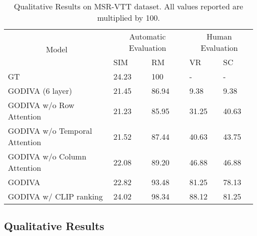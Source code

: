 \documentclass{article}
\begin{document}
\newcommand{\pwidth}{1.3cm}
\begin{table*}[h]
\begin{center}
\caption{Qualitative Results on MSR-VTT dataset. All values reported
are multiplied by 100.}
\label{tab:mod}
\begin{tabular}{p{6cm}p{\pwidth}p{\pwidth}p{\pwidth}p{\pwidth}}
\toprule
\multicolumn{1}{c}{\multirow{2}{*}{Model}}&\multicolumn{2}{c}{Automatic Evaluation} & \multicolumn{2}{c}{Human Evaluation}\\
\cmidrule{2-3} \cmidrule{4-5}
 & SIM & RM & VR & SC  \\
\midrule
GT & 24.23 & 100 & - & -   \\

GODIVA (6 layer) & 21.45 & 86.94 & 9.38 & 9.38 \\
GODIVA w/o Row Attention & 21.23 & 85.95 & 31.25 & 40.63   \\
GODIVA w/o Temporal Attention  & 21.52 & 87.44 & 40.63 & 43.75  \\
GODIVA w/o Column Attention  & 22.08 & 89.20 & 46.88 & 46.88  \\
GODIVA  & 22.82 & 93.48 & 81.25 & 78.13\\
GODIVA w/ CLIP ranking  & 24.02 & 98.34 & 88.12 & 81.25  \\
\bottomrule
\end{tabular}
\label{tab:metric}
\end{center}
\end{table*}





\subsection{Qualitative Results}
\end{document}
